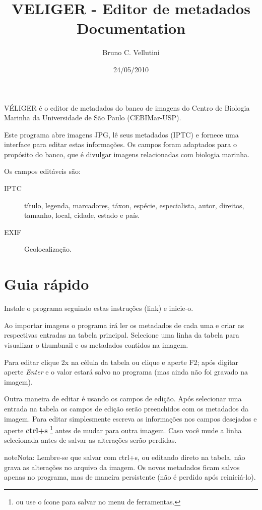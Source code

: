 \documentclass[letterpaper,10pt,portuguese]{manual}
\title{VELIGER - Editor de metadados Documentation}
\date{24/05/2010}
\author{Bruno C. Vellutini}
\begin{document}
\maketitle
\tableofcontents
\hypertarget{--doc-index}{}


VÉLIGER é o editor de metadados do banco de imagens do Centro de Biologia
Marinha da Universidade de São Paulo (CEBIMar-USP).

Este programa abre imagens JPG, lê seus metadados (IPTC) e fornece uma
interface para editar estas informações. Os campos foram adaptados para o
propósito do banco, que é divulgar imagens relacionadas com biologia marinha.

Os campos editáveis são:
\begin{description}
\item[IPTC] \leavevmode
título, legenda, marcadores, táxon, espécie, especialista, autor, direitos,
tamanho, local, cidade, estado e país.

\item[EXIF] \leavevmode
Geolocalização.

\end{description}


\chapter{Guia rápido}

Instale o programa seguindo estas instruções (link) e inicie-o.

Ao importar imagens o programa irá ler os metadados de cada uma e criar as
respectivas entradas na tabela principal. Selecione uma linha da tabela para
visualizar o thumbnail e os metadados contidos na imagem.

Para editar clique 2x na célula da tabela ou clique e aperte F2; após digitar
aperte \emph{Enter} e o valor estará salvo no programa (mas ainda não foi gravado na
imagem).

Outra maneira de editar é usando os campos de edição. Após selecionar uma
entrada na tabela os campos de edição serão preenchidos com os metadados da
imagem. Para editar simplesmente escreva as informações nos campos desejados e
aperte \textbf{ctrl+s} \footnote{
ou use o ícone para salvar no menu de ferramentas.
} antes de mudar para outra imagem. Caso você mude a linha
selecionada antes de salvar as alterações serão perdidas.

\begin{notice}{note}{Nota:}
Lembre-se que salvar com ctrl+s, ou editando direto na tabela, não
grava as alterações no arquivo da imagem. Os novos metadados ficam salvos
apenas no programa, mas de maneira persistente (não é perdido após
reiniciá-lo).
\end{notice}
\end{document}
